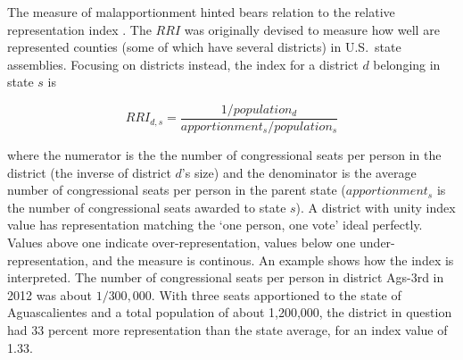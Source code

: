 \documentclass[letter,12pt]{article}
\begin{document}
The measure of malapportionment hinted bears relation to the relative representation index \citet{ansolabehere.gerber.snyderCourtRedis2002}. The $RRI$ was originally devised to measure how well are represented counties (some of which have several districts) in U.S.\ state assemblies. Focusing on districts instead, the index for a district $d$ belonging in state $s$ is

\begin{equation*}
RRI_{d,s} = \frac{1/population_d}{apportionment_s/population_s}
\end{equation*}

\noindent where the numerator is the the number of congressional seats per person in the district (the inverse of district $d$'s size) and the denominator is the average number of congressional seats per person in the parent state ($apportionment_s$ is the number of congressional seats awarded to state $s$). A district with unity index value has representation matching the `one person, one vote' ideal perfectly. Values above one indicate over-representation, values below one under-representation, and the measure is continous. An example shows how the index is interpreted. The number of congressional seats per person in district Ags-3rd in 2012 was about $1/300,000$. With three seats apportioned to the state of Aguascalientes and a total population of about 1,200,000, the district in question had 33 percent more representation than the state average, for an index value of 1.33. 

\end{document}

